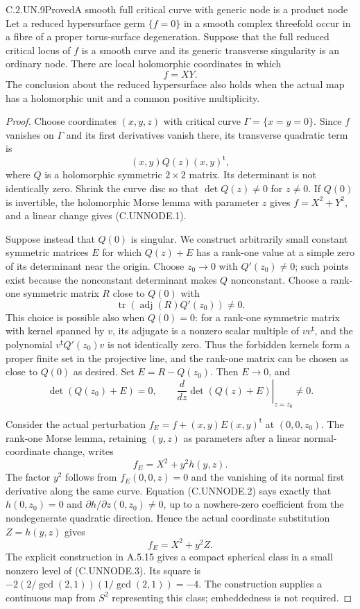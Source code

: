 \begin{statement}{C.2.UN.9}{Proved}{A smooth full critical curve with generic node is a product node}
Let a reduced hypersurface germ $\{f=0\}$ in a smooth
complex threefold occur in a fibre of a proper torus-surface
degeneration. Suppose that the full reduced critical locus
of $f$ is a smooth curve and its generic transverse
singularity is an ordinary node. There are local
holomorphic coordinates in which
\[
                            f=XY.                  \tag{C.UNNODE.1}
\]
The conclusion about the reduced hypersurface also holds
when the actual map has a holomorphic unit and a common
positive multiplicity.
\end{statement}
\begin{proof}
Choose coordinates $(x,y,z)$ with critical curve
$\Gamma=\{x=y=0\}$. Since $f$ vanishes on $\Gamma$ and
its first derivatives vanish there, its transverse
quadratic term is
\[
                  (x,y)Q(z)(x,y)^{\mathsf t},
\]
where $Q$ is a holomorphic symmetric $2\times2$ matrix.
Its determinant is not identically zero. Shrink the
curve disc so that $\det Q(z)\ne0$ for $z\ne0$.
If $Q(0)$ is invertible, the holomorphic Morse lemma
with parameter $z$ gives $f=X^2+Y^2$, and a linear
change gives (C.UNNODE.1).

Suppose instead that $Q(0)$ is singular. We construct
arbitrarily small constant symmetric matrices $E$
for which $Q(z)+E$ has a rank-one value at a simple
zero of its determinant near the origin. Choose
$z_0\to0$ with $Q'(z_0)\ne0$; such points exist
because the nonconstant determinant makes $Q$
nonconstant. Choose a rank-one symmetric matrix
$R$ close to $Q(0)$ with
\[
                  \operatorname{tr}
                      (\operatorname{adj}(R)Q'(z_0))\ne0.
\]
This choice is possible also when $Q(0)=0$: for a
rank-one symmetric matrix with kernel spanned by
$v$, its adjugate is a nonzero scalar multiple of
$vv^{\mathsf t}$, and the polynomial
$v^{\mathsf t}Q'(z_0)v$ is not identically zero.
Thus the forbidden kernels form a proper finite
set in the projective line, and the rank-one
matrix can be chosen as close to $Q(0)$ as desired.
Set $E=R-Q(z_0)$. Then $E\to0$, and
\[
 \det(Q(z_0)+E)=0,\qquad
 \left.\frac{d}{dz}\det(Q(z)+E)\right|_{z=z_0}\ne0.
 \tag{C.UNNODE.2}
\]

Consider the actual perturbation
$f_E=f+(x,y)E(x,y)^{\mathsf t}$ at $(0,0,z_0)$.
The rank-one Morse lemma, retaining $(y,z)$ as
parameters after a linear normal-coordinate change,
writes
\[
                         f_E=X^2+y^2h(y,z).
\]
The factor $y^2$ follows from $f_E(0,0,z)=0$ and
the vanishing of its normal first derivative along
the same curve. Equation (C.UNNODE.2) says exactly
that $h(0,z_0)=0$ and $\partial h/\partial z(0,z_0)
\ne0$, up to a nowhere-zero coefficient from the
nondegenerate quadratic direction. Hence the actual
coordinate substitution $Z=h(y,z)$ gives
\[
                            f_E=X^2+y^2Z.          \tag{C.UNNODE.3}
\]
The explicit construction in A.5.15 gives a compact
spherical class in a small nonzero level of
(C.UNNODE.3). Its square is
$-2(2/\gcd(2,1))(1/\gcd(2,1))=-4$.
The construction supplies a continuous map from
$S^2$ representing this class; embeddedness is
not required.


\end{proof}
